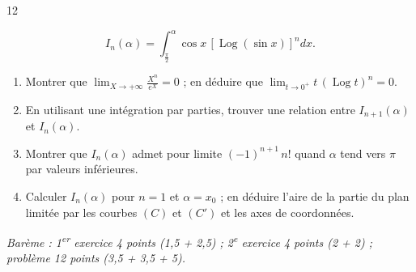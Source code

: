 \documentclass{axiobac}
\begin{document}
\begin{probleme}{12}
\begin{enumerate}
    \[
    I_n(\alpha) = \int_{\frac{\pi}{2}}^{\alpha} \cos x \, \left[ \operatorname{Log}(\sin x) \right]^n dx .
    \]
    \begin{enumerate}
        \item Montrer que $\displaystyle\lim_{X \to +\infty} \frac{X^n}{e^X} = 0$ ; en déduire que $\displaystyle\lim_{t \to 0^+} t\,(\operatorname{Log} t)^n = 0$.
        \item En utilisant une intégration par parties, trouver une relation entre $I_{n+1}(\alpha)$ et $I_n(\alpha)$.
        \item Montrer que $I_n(\alpha)$ admet pour limite $(-1)^{n+1}\, n!$ quand $\alpha$ tend vers $\pi$ par valeurs inférieures.
        \item Calculer $I_n(\alpha)$ pour $n = 1$ et $\alpha = x_0$ ; en déduire l'aire de la partie du plan limitée par les courbes $(C)$ et $(C')$ et les axes de coordonnées.
    \end{enumerate}
\end{enumerate}

\end{probleme}

\vspace{1em}
\noindent\textit{Barème : 1\textsuperscript{er} exercice 4 points (1,5 + 2,5) ; 2\textsuperscript{e} exercice 4 points (2 + 2) ; problème 12 points (3,5 + 3,5 + 5).}
\end{document}
